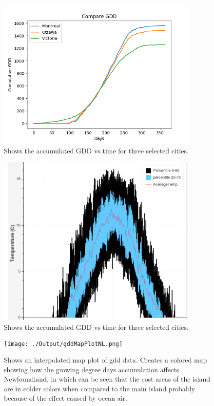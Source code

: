 \documentclass[12pt]{article}
\begin{document}
	\begin{figure}[!htbp]
		\centering
		\includegraphics[width=0.9\textwidth]{./Output/CumulativeGDD.png} 
		\caption{\scriptsize Shows the accumulated GDD vs time for three selected cities.}\label{GDDplot}		  
	\end{figure}

	\begin{figure}[!htbp]
		\centering
		\includegraphics[width=0.9\textwidth]{./Report/GDDstats.png} 
		\caption{\scriptsize Shows the accumulated GDD vs time for three selected cities.}\label{GDDplot}		  
	\end{figure}


	\begin{figure}[!htbp]
		\centering
		\texttt{[image: ./Output/gddMapPlotNL.png]} 
		\caption{\scriptsize Shows an interpolated map plot of gdd data.
		Creates a colored map showing how the growing degree days accumulation affects Newfoundland, 
		in which can be seen that the cost areas of the island are in colder colors when compared to
		the main island probably because of the effect caused by ocean air.
		}\label{gddMapNl}		  
	\end{figure}
\end{document}
